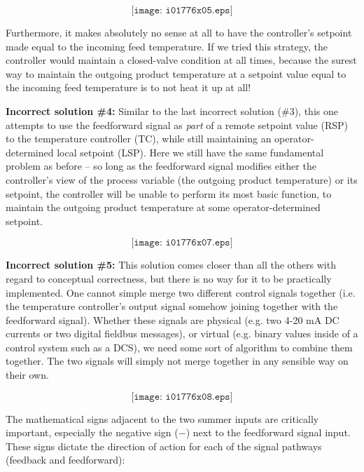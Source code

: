 $$\texttt{[image: i01776x05.eps]}$$

Furthermore, it makes absolutely no sense at all to have the controller's setpoint made equal to the incoming feed temperature.  If we tried this strategy, the controller would maintain a closed-valve condition at all times, because the surest way to maintain the outgoing product temperature at a setpoint value equal to the incoming feed temperature is to not heat it up at all!



\vskip 10pt

\filbreak


\noindent
{\bf Incorrect solution \#4:} Similar to the last incorrect solution (\#3), this one attempts to use the feedforward signal as {\it part} of a remote setpoint value (RSP) to the temperature controller (TC), while still maintaining an operator-determined local setpoint (LSP).  Here we still have the same fundamental problem as before -- so long as the feedforward signal modifies either the controller's view of the process variable (the outgoing product temperature) or its setpoint, the controller will be unable to perform its most basic function, to maintain the outgoing product temperature at some operator-determined setpoint.

$$\texttt{[image: i01776x07.eps]}$$




\vskip 10pt

\filbreak


\noindent
{\bf Incorrect solution \#5:} This solution comes closer than all the others with regard to conceptual correctness, but there is no way for it to be practically implemented.  One cannot simple merge two different control signals together (i.e. the temperature controller's output signal somehow joining together with the feedforward signal).  Whether these signals are physical (e.g. two 4-20 mA DC currents or two digital fieldbus messages), or virtual (e.g. binary values inside of a control system such as a DCS), we need some sort of algorithm to combine them together.  The two signals will simply not merge together in any sensible way on their own.

$$\texttt{[image: i01776x08.eps]}$$








The mathematical signs adjacent to the two summer inputs are critically important, especially the negative sign ($-$) next to the feedforward signal input.  These signs dictate the direction of action for each of the signal pathways (feedback and feedforward):

